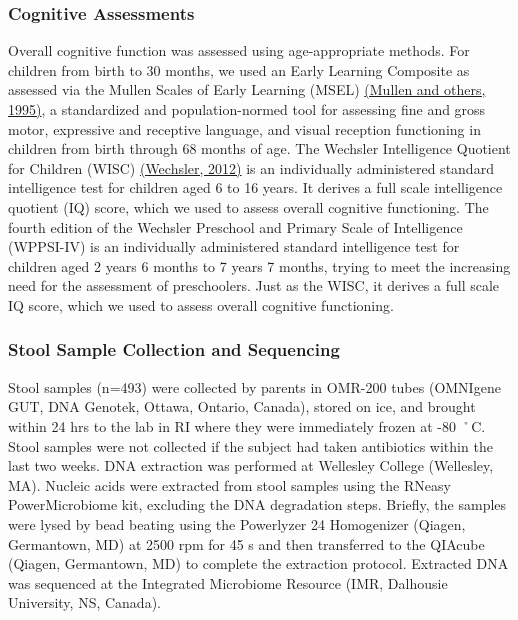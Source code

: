 \documentclass[
]{article}
\begin{document}
\hypertarget{cognitive-assessments}{%
\subsubsection{Cognitive Assessments}\label{cognitive-assessments}}

Overall cognitive function was assessed using age-appropriate methods.
For children from birth to 30 months, we used an Early Learning
Composite as assessed via the Mullen Scales of Early Learning (MSEL)
\href{https://www.zotero.org/google-docs/?NSyykd}{(Mullen and others,
1995)}, a standardized and population-normed tool for assessing fine and
gross motor, expressive and receptive language, and visual reception
functioning in children from birth through 68 months of age. The
Wechsler Intelligence Quotient for Children (WISC)
\href{https://www.zotero.org/google-docs/?OopdA1}{(Wechsler, 2012)} is
an individually administered standard intelligence test for children
aged 6 to 16 years. It derives a full scale intelligence quotient (IQ)
score, which we used to assess overall cognitive functioning. The fourth
edition of the Wechsler Preschool and Primary Scale of Intelligence
(WPPSI-IV) is an individually administered standard intelligence test
for children aged 2 years 6 months to 7 years 7 months, trying to meet
the increasing need for the assessment of preschoolers. Just as the
WISC, it derives a full scale IQ score, which we used to assess overall
cognitive functioning.

\hypertarget{stool-sample-collection-and-sequencing}{%
\subsubsection{Stool Sample Collection and
Sequencing}\label{stool-sample-collection-and-sequencing}}

Stool samples (n=493) were collected by parents in OMR-200 tubes
(OMNIgene GUT, DNA Genotek, Ottawa, Ontario, Canada), stored on ice, and
brought within 24 hrs to the lab in RI where they were immediately
frozen at -80 ˚C. Stool samples were not collected if the subject had
taken antibiotics within the last two weeks. DNA extraction was
performed at Wellesley College (Wellesley, MA). Nucleic acids were
extracted from stool samples using the RNeasy PowerMicrobiome kit,
excluding the DNA degradation steps. Briefly, the samples were lysed by
bead beating using the Powerlyzer 24 Homogenizer (Qiagen, Germantown,
MD) at 2500 rpm for 45 s and then transferred to the QIAcube (Qiagen,
Germantown, MD) to complete the extraction protocol. Extracted DNA was
sequenced at the Integrated Microbiome Resource (IMR, Dalhousie
University, NS, Canada).
\end{document}
